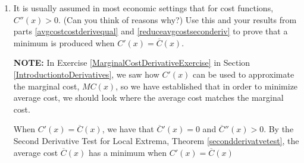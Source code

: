 \documentclass{ximera}
\begin{document}
\begin{problem}
\begin{enumerate}
\begin{solution}
\end{solution}


\item  It is usually assumed in most economic settings that for cost functions, $C''(x) > 0$. (Can you think of reasons why?)  Use this and your results from parts \ref{avgcostcostderivequal} and \ref{reduceavgcostseconderiv} to prove that a minimum is produced  when $C'(x) = \overline{C}(x)$.  

\textbf{NOTE:} In Exercise \ref{MarginalCostDerivativeExercise} in Section \ref{IntroductiontoDerivatives}, we saw how $C'(x)$ can be used to approximate the marginal cost, $MC(x)$, so we have established that in order to minimize average cost, we should look where the average cost matches the marginal cost.

\begin{solution}
When $C'(x) = \overline{C}(x)$, we have that $\overline{C}'(x) = 0$ and $\overline{C}''(x) > 0$. By the Second Derivative Test for Local Extrema,  Theorem \ref{secondderivatvetest}, the average cost $\overline{C}(x)$ has a minimum when $C'(x) = \overline{C}(x)$ 
\end{solution}


\end{enumerate}

\end{problem}
\end{document}
